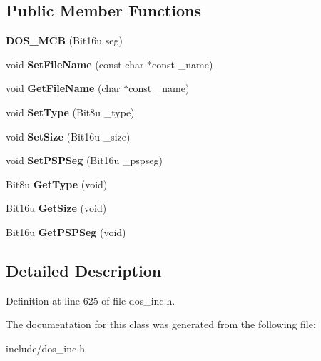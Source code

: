 \subsection*{Public Member Functions}
\begin{DoxyCompactItemize}
\item 
\hypertarget{classDOS__MCB_a0b1bf404720604aafd755212f8d06ffc}{{\bfseries D\-O\-S\-\_\-\-M\-C\-B} (Bit16u seg)}\label{classDOS__MCB_a0b1bf404720604aafd755212f8d06ffc}

\item 
\hypertarget{classDOS__MCB_adb5a8fae4d7777501c48f6fc783da385}{void {\bfseries Set\-File\-Name} (const char $\ast$const \-\_\-name)}\label{classDOS__MCB_adb5a8fae4d7777501c48f6fc783da385}

\item 
\hypertarget{classDOS__MCB_a9b76d148117232e7c4dceb0a7a990d3d}{void {\bfseries Get\-File\-Name} (char $\ast$const \-\_\-name)}\label{classDOS__MCB_a9b76d148117232e7c4dceb0a7a990d3d}

\item 
\hypertarget{classDOS__MCB_ab9545960540afa53f5ead1d49a48890e}{void {\bfseries Set\-Type} (Bit8u \-\_\-type)}\label{classDOS__MCB_ab9545960540afa53f5ead1d49a48890e}

\item 
\hypertarget{classDOS__MCB_a524e972434b1f0b57435a95d6dddd4b5}{void {\bfseries Set\-Size} (Bit16u \-\_\-size)}\label{classDOS__MCB_a524e972434b1f0b57435a95d6dddd4b5}

\item 
\hypertarget{classDOS__MCB_a4a0d73cdef5da789a59a2e141d69b0b6}{void {\bfseries Set\-P\-S\-P\-Seg} (Bit16u \-\_\-pspseg)}\label{classDOS__MCB_a4a0d73cdef5da789a59a2e141d69b0b6}

\item 
\hypertarget{classDOS__MCB_ab5aca8f3fe000215dd7a563a17a990f9}{Bit8u {\bfseries Get\-Type} (void)}\label{classDOS__MCB_ab5aca8f3fe000215dd7a563a17a990f9}

\item 
\hypertarget{classDOS__MCB_a133271b66d178a643a8090c2b3a8784d}{Bit16u {\bfseries Get\-Size} (void)}\label{classDOS__MCB_a133271b66d178a643a8090c2b3a8784d}

\item 
\hypertarget{classDOS__MCB_a3e8986ea9546d0d914202a41bd774288}{Bit16u {\bfseries Get\-P\-S\-P\-Seg} (void)}\label{classDOS__MCB_a3e8986ea9546d0d914202a41bd774288}

\end{DoxyCompactItemize}


\subsection{Detailed Description}


Definition at line 625 of file dos\-\_\-inc.\-h.



The documentation for this class was generated from the following file\-:\begin{DoxyCompactItemize}
\item 
include/dos\-\_\-inc.\-h\end{DoxyCompactItemize}
